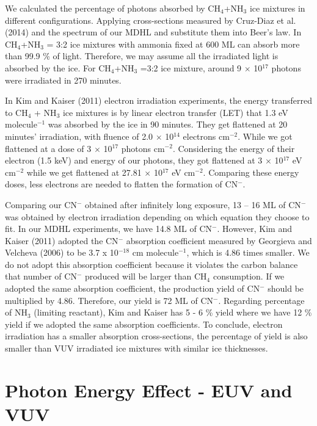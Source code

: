 We calculated the percentage of photons absorbed by CH$_4$+NH$_3$ ice mixtures in different configurations. Applying cross-sections measured by Cruz-Diaz et al. (2014) and the spectrum of our MDHL and substitute them into Beer’s law. In CH$_4$+NH$_3$ = 3:2 ice mixtures with ammonia fixed at 600 ML can absorb more than 99.9 \% of light. Therefore, we may assume all the irradiated light is absorbed by the ice. For CH$_4$+NH$_3$ =3:2 ice mixture, around 9 $\times$ 10$^{17}$ photons were irradiated in 270 minutes.

In Kim and Kaiser (2011) electron irradiation experiments, the energy transferred to CH$_4$ + NH$_3$ ice mixtures is by linear electron transfer (LET) that 1.3 eV molecule$^{-1}$ was absorbed by the ice in 90 minutes. They get flattened at 20 minutes’ irradiation, with fluence of 2.0 $\times$ 10$^{14}$ electrons cm$^{-2}$. While we got flattened at a dose of 3 $\times$ 10$^{17}$ photons cm$^{-2}$. Considering the energy of their electron (1.5 keV) and energy of our photons, they got flattened at 3 $\times$ 10$^{17}$ eV cm$^{-2}$ while we get flattened at 27.81 $\times$ 10$^{17}$ eV cm$^{-2}$. Comparing these energy doses, less electrons are needed to flatten the formation of CN$^-$.

Comparing our CN$^-$ obtained after infinitely long exposure, 13 – 16 ML of CN$^-$ was obtained by electron irradiation depending on which equation they choose to fit. In our MDHL experiments, we have 14.8 ML of CN$^-$. However, Kim and Kaiser (2011) adopted the CN$^-$ absorption coefficient measured by Georgieva and Velcheva (2006) to be 3.7 x 10$^{-18}$ cm molecule$^{-1}$, which is 4.86 times smaller. We do not adopt this absorption coefficient because it violates the carbon balance that number of CN$^-$ produced will be larger than CH$_4$ consumption. If we adopted the same absorption coefficient, the production yield of CN$^-$ should be multiplied by 4.86. Therefore, our yield is 72 ML of CN$^-$. Regarding percentage of NH$_3$ (limiting reactant), Kim and Kaiser has 5 - 6 \% yield where we have 12 \% yield if we adopted the same absorption coefficients. To conclude, electron irradiation has a smaller absorption cross-sections, the percentage of yield is also smaller than VUV irradiated ice mixtures with similar ice thicknesses.




\section{Photon Energy Effect - EUV and VUV}

